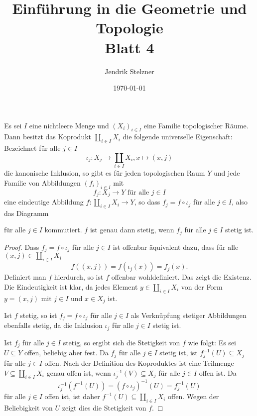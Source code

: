 \documentclass[a4paper,10pt]{article}
\title{\sc Einführung in die Geometrie und Topologie \\ \Large Blatt 4}
\author{Jendrik Stelzner}
\date{\today}
\begin{document}
\maketitle


\begin{lem}\label{lem: universell Koprodukt}
 Es sei $I$ eine nichtleere Menge und $(X_i)_{i \in I}$ eine Familie topologischer Räume. Dann besitzt das Koprodukt $\coprod_{i \in I} X_i$ die folgende universelle Eigenschaft: Bezeichnet für alle $j \in I$
 \[
  \iota_j : X_j \to \coprod_{i \in I} X_i, x \mapsto (x,j)
 \]
 die kanonische Inklusion, so gibt es für jeden topologischen Raum $Y$ und jede Familie von Abbildungen $(f_i)_{i \in I}$ mit
 \[
  f_j : X_j \to Y \text{ für alle } j \in I
 \]
 eine eindeutige Abbildung $f : \coprod_{i \in I} X_i \to Y$, so dass $f_j = f \circ \iota_j$ für alle $j \in I$, also das Diagramm
 \begin{center}
 \end{center}
für alle $j \in I$ kommutiert. $f$ ist genau dann stetig, wenn $f_j$ für alle $j \in I$ stetig ist.
\end{lem}
\begin{proof}
 Dass $f_j = f \circ \iota_j$ für alle $j \in I$ ist offenbar äquivalent dazu, dass für alle $(x,j) \in \coprod_{i \in I} X_i$
 \[
  f((x,j)) = f(\iota_j(x)) = f_j(x).
 \]
 Definiert man $f$ hierdurch, so ist $f$ offenbar wohldefiniert. Das zeigt die Existenz. Die Eindeutigkeit ist klar, da jedes Element $y \in \coprod_{i \in I} X_i$ von der Form $y = (x,j)$ mit $j \in I$ und $x \in X_j$ ist.
 
 Ist $f$ stetig, so ist $f_j = f \circ \iota_j$ für alle $j \in I$ als Verknüpfung stetiger Abbildungen ebenfalls stetig, da die Inklusion $\iota_j$ für alle $j \in I$ stetig ist.
 
 Ist $f_j$ für alle $j \in I$ stetig, so ergibt sich die Stetigkeit von $f$ wie folgt: Es sei $U \subseteq Y$ offen, beliebig aber fest. Da $f_j$ für alle $j \in I$ stetig ist, ist $f_j^{-1}(U) \subseteq X_j$ für alle $j \in I$ offen. Nach der Definition des Koproduktes ist eine Teilmenge $V \subseteq \coprod_{i \in I} X_i$ genau offen ist, wenn $\iota_j^{-1}(V) \subseteq X_j$ für alle $j \in I$ offen ist. Da
 \[
  \iota_j^{-1}(f^{-1}(U))
  = (f \circ \iota_j)^{-1}(U)
  = f_j^{-1}(U)
 \]
 für alle $j \in I$ offen ist, ist daher $f^{-1}(U) \subseteq \coprod_{i \in I} X_i$ offen. Wegen der Beliebigkeit von $U$ zeigt dies die Stetigkeit von $f$.
\end{proof}
\end{document}
